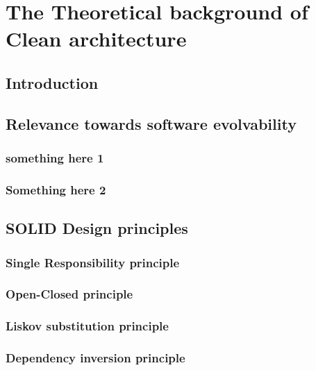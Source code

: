 \section{The Theoretical background of Clean architecture}

\subsection{Introduction}
\lipsum[1-1]
\subsection{Relevance towards software evolvability}
\lipsum[1-1]
\subsubsection{something here 1}
\lipsum[1-1]
\subsubsection{Something here 2}
\lipsum[1-1]
\subsection{SOLID Design principles}
\lipsum[1-1]
\subsubsection{Single Responsibility principle}
\lipsum[1-1]
\subsubsection{Open-Closed principle}
\lipsum[1-1]
\subsubsection{Liskov substitution principle}
\lipsum[1-1]
\subsubsection{Dependency inversion principle}
\lipsum[1-1]